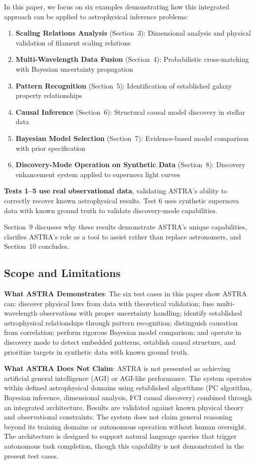 \documentclass[usenatbib]{rasti}
\begin{document}
In this paper, we focus on six examples demonstrating how this integrated approach can be applied to astrophysical inference problems:
\begin{enumerate}
\item \textbf{Scaling Relations Analysis} (Section~3): Dimensional analysis and physical validation of filament scaling relations
\item \textbf{Multi-Wavelength Data Fusion} (Section~4): Probabilistic cross-matching with Bayesian uncertainty propagation
\item \textbf{Pattern Recognition} (Section~5): Identification of established galaxy property relationships
\item \textbf{Causal Inference} (Section~6): Structural causal model discovery in stellar data
\item \textbf{Bayesian Model Selection} (Section~7): Evidence-based model comparison with prior specification
\item \textbf{Discovery-Mode Operation on Synthetic Data} (Section~8): Discovery enhancement system applied to supernova light curves
\end{enumerate}

\textbf{Tests 1--5 use real observational data}, validating ASTRA's ability to correctly recover known astrophysical results. Test 6 uses synthetic supernova data with known ground truth to validate discovery-mode capabilities.

Section~9 discusses why these results demonstrate ASTRA's unique capabilities, clarifies ASTRA's role as a tool to assist rather than replace astronomers, and Section~10 concludes.

\subsection{Scope and Limitations}

\textbf{What ASTRA Demonstrates}: The six test cases in this paper show ASTRA can: discover physical laws from data with theoretical validation; fuse multi-wavelength observations with proper uncertainty handling; identify established astrophysical relationships through pattern recognition; distinguish causation from correlation; perform rigorous Bayesian model comparison; and operate in discovery mode to detect embedded patterns, establish causal structure, and prioritize targets in synthetic data with known ground truth.

\textbf{What ASTRA Does Not Claim}: ASTRA is not presented as achieving artificial general intelligence (AGI) or AGI-like performance. The system operates within defined astrophysical domains using established algorithms (PC algorithm, Bayesian inference, dimensional analysis, FCI causal discovery) combined through an integrated architecture. Results are validated against known physical theory and observational constraints. The system does not claim general reasoning beyond its training domains or autonomous operation without human oversight. The architecture is designed to support natural language queries that trigger autonomous task completion, though this capability is not demonstrated in the present test cases.
\end{document}
